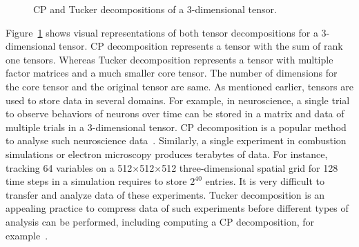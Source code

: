 \documentclass[a4paper,11pt]{article}
\begin{document}
\begin{figure}[htb]
\begin{center}
{}
			\caption{CP and Tucker decompositions of a 3-dimensional tensor.\label{fig:CTdecompositions}}
		\end{center}		
	\end{figure}
	
	
	
	
	Figure~\ref{fig:CTdecompositions} shows visual representations of both tensor decompositions for a 3-dimensional tensor. CP decomposition represents a tensor with the sum of rank one tensors. Whereas Tucker decomposition represents a tensor with multiple factor matrices and a much smaller core tensor. The number of dimensions for the core tensor and the original tensor are same. As mentioned earlier, tensors are used to store data in several domains. For example, in neuroscience, a single trial to observe behaviors of neurons over time can be stored in a matrix and data of multiple trials in a 3-dimensional tensor. CP decomposition is a popular method to analyse such neuroscience data~\cite{WKV-Neuron-2018,HKD-SIAM-2020}. Similarly, a single experiment in combustion simulations or electron microscopy produces terabytes of data. For instance, tracking 64 variables on a 512$\times$512$\times$512 three-dimensional spatial grid for 128 time steps in a simulation requires to store $2^{40}$ entries. It is very difficult to transfer and analyze data of these experiments. Tucker decomposition is an appealing practice to compress data of such experiments before different types of analysis can be performed, including computing a CP decomposition, for example~\cite{ABK-IPDPS-2016,BKK-TOMS-2020,RC-CILS-1998}.
	
\end{document}
